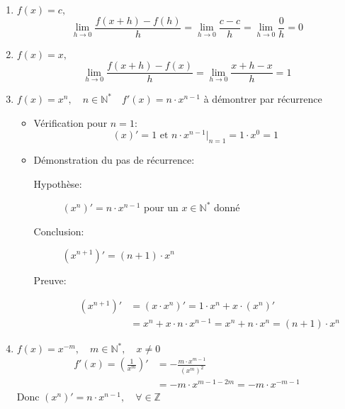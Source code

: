 \documentclass[
    11pt,
    a4paper,
    oneside,
    headinlcude, footinclude,
    twoside,
]{report}
\begin{document}
\begin{enumerate}
    \item $f(x) = c, $ 
        $$\lim_{h \to 0} \frac{f(x+h) - f(h)}{h} = \lim_{h \to 0}
        \frac{c-c}{h} = \lim_{h \to 0} \frac{0}{h} = 0 $$
    \item $f(x) = x, $
        $$\lim_{h \to 0} \frac{f(x+h) - f(x)}{h} = \lim_{h \to 0} \frac{x +h
        -x}{h} = 1$$
    \item $f(x) = x^{n}, \quad n \in \mathbb{N}^{*} \quad f'(x) = n \cdot
        x^{n-1}$ à démontrer par récurrence
        \begin{itemize}
            \item Vérification pour $n = 1$:
                $$(x)' = 1 \text{ et }  n\cdot x^{n-1}\Bigr|_{n=1} = 1 \cdot x^{0} = 1$$
            \item Démonstration du pas de récurrence:
                \begin{description}
                    \item[Hypothèse:] $(x^{n})' = n\cdot x^{n-1}$ pour un $x \in
                        \mathbb{N}^{*}$ donné
                    \item[Conclusion:]$(x^{n+1})' = (n+1)\cdot x^{n}$
                    \item[Preuve:] 
                        \[
                            \begin{split}
                                (x^{n+1})' &= (x \cdot x^{n})' = 1 \cdot x^{n} + x\cdot (x^{n})' \\
                                &=x^{n} + x \cdot n \cdot x^{n-1} = x^{n} + n\cdot x^{n} = (n + 1)\cdot x ^{n}
                            \end{split}
                        \]
                \end{description}
        \end{itemize}
    \item $f(x) = x ^{-m}, \quad m \in \mathbb{N}^{*}, \quad x \neq 0$  
        \[
            \begin{split}
                f'(x) = \left(\frac{1}{x^{m}}\right)' &= -\frac{m \cdot x^{m-1}}{(x^{m})^{2}}\\
                & = - m\cdot x^{m-1 - 2m} = -m \cdot x^{-m-1}
            \end{split}
        \]
        Donc $(x^{n})'  = n \cdot x ^{n-1}, \quad \forall \in \mathbb{Z}$


\end{enumerate}
\end{document}
